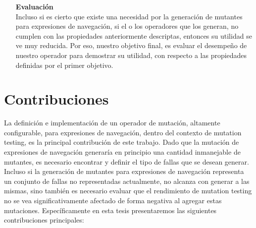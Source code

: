 \begin{enumerate}[leftmargin=.75cm,align=left,style=nextline]
	\item[\textbf{Evaluaci\'on}]\mbox{}\\
	Incluso si es cierto que existe una necesidad por la generaci\'on de mutantes para expresiones de navegaci\'on, si el o los operadores que los generan, no cumplen con las propiedades anteriormente descriptas, entonces su utilidad se ve muy reducida. Por eso, nuestro objetivo final, es evaluar el desempe\~no de nuestro operador para demostrar su utilidad, con respecto a las propiedades definidas por el primer objetivo.
\end{enumerate}


\section{Contribuciones}
\label{sec:intro.contribuciones}


La definici\'on e implementaci\'on de un operador de mutaci\'on, altamente configurable, para expresiones de navegaci\'on, dentro del contexto de mutation testing, es la principal contribuci\'on de este trabajo. Dado que la mutaci\'on de expresiones de navegaci\'on generar\'ia en principio una cantidad inmanejable de mutantes, es necesario encontrar y definir el tipo de fallas que se desean generar. Incluso si la generaci\'on de mutantes para expresiones de navegaci\'on representa un conjunto de fallas no representadas actualmente, no alcanza con generar a las mismas, sino tambi\'en es necesario evaluar que el rendimiento de mutation testing no se vea significativamente afectado de forma negativa al agregar estas mutaciones. Espec\'ificamente en esta tesis presentaremos las siguientes contribuciones principales:

